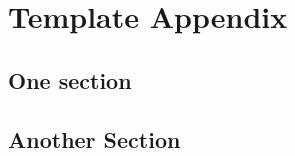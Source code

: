 
\chapter{Template Appendix}

%
\section{One section}

\blindtext


%
\section{Another Section}

\blindtext
